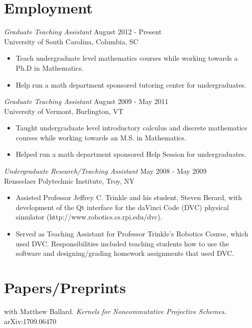 \documentclass{article}
\begin{document}
  \section*{Employment}
  \textsl{Graduate Teaching Assistant} \hfill August 2012 - Present \\
  University of South Carolina, Columbia, SC
  \begin{itemize}  \itemsep -2pt %
  \item
    Teach undergraduate level mathematics courses while working towards a Ph.D in Mathematics.
  \item 
    Help run a math department sponsored tutoring center for undergraduates.
  \end{itemize}
  
  \noindent\textsl{Graduate Teaching Assistant} \hfill August 2009 - May 2011 \\
  University of Vermont, Burlington, VT
  \begin{itemize}  \itemsep -2pt %
  \item
    Taught undergraduate level introductory calculus and discrete mathematics courses while working towards an M.S. in Mathematics.
  \item 
    Helped run a math department sponsored Help Session for undergraduates.
  \end{itemize}
  \newpage
  \noindent\textsl{Undergraduate Research/Teaching Assistant} \hfill May 2008 - May 2009 \\
  Rensselaer Polytechnic Institute, Troy, NY
  \begin{itemize}  \itemsep -2pt %
  \item Assisted Professor Jeffrey C. Trinkle and his student, Steven Berard, with development of the Qt interface for the daVinci Code (DVC) physical simulator (http://www.robotics.cs.rpi.edu/dvc).
  \item Served as Teaching Assistant for Professor Trinkle's Robotics Course, which used DVC.
    Responsibilities included teaching students how to use the software and designing/grading homework assignments that used DVC.
  \end{itemize}

  \section*{Papers/Preprints}
  with Matthew Ballard.  \textsl{Kernels for Noncommutative Projective Schemes.} 
  arXiv:1709.06470
\end{document}
